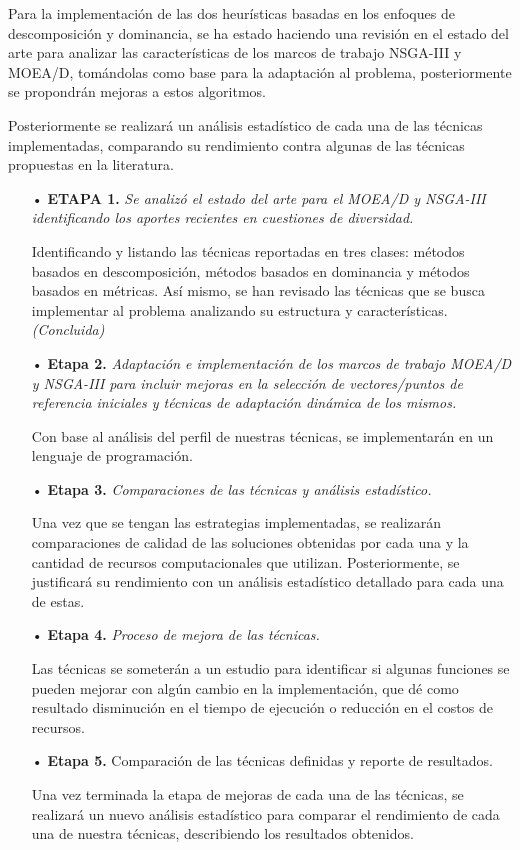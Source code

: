 \documentclass[letterpaper,10pt]{article}
\begin{document}
Para la implementación de las dos heurísticas basadas en los enfoques de descomposición y dominancia, se ha estado haciendo una revisión en el estado del arte para analizar las características de los marcos de trabajo NSGA-III y MOEA/D, tomándolas  como  base para la adaptación al problema, posteriormente se propondrán mejoras a estos algoritmos.
 
Posteriormente se realizará un análisis estadístico de cada una de las técnicas implementadas, comparando su rendimiento contra algunas de las  técnicas propuestas en la literatura.
 
 \begin{itemize}
 \item[•] \textbf{ETAPA 1.} \emph{Se analizó el estado del arte para el MOEA/D y NSGA-III identificando los aportes recientes en cuestiones de diversidad.}
\item[] Identificando y listando las técnicas reportadas en tres clases: métodos basados en descomposición, métodos basados en dominancia y métodos basados en métricas. Así mismo, se han revisado las técnicas que se busca implementar al problema analizando su estructura y características.
\emph{(Concluida)}

\item[•] \textbf{Etapa 2.} \emph{Adaptación e implementación de los marcos de trabajo MOEA/D y NSGA-III para incluir mejoras en la selección de vectores/puntos de referencia iniciales y técnicas de adaptación dinámica de los mismos.}

\item[] Con base al análisis del perfil de nuestras técnicas, se implementarán en un lenguaje de programación.
        
\item[•] \textbf{Etapa 3.} \emph{Comparaciones de las técnicas y análisis estadístico.}

\item [] Una vez que se tengan las estrategias implementadas, se realizarán comparaciones de calidad de las soluciones obtenidas por cada una y la cantidad de recursos computacionales  que utilizan. Posteriormente, se justificará su rendimiento con un análisis estadístico detallado para cada  una de estas.

\item[•] \textbf{Etapa 4.} \emph{Proceso de mejora de las técnicas.}

\item[] Las técnicas se someterán a un estudio para identificar si algunas funciones se pueden mejorar con algún cambio en la implementación, que dé como resultado disminución en el tiempo de ejecución o reducción en el costos de recursos.


\item[•] \textbf{Etapa 5.} Comparación de las técnicas definidas y reporte de resultados.

\item[] Una vez terminada la etapa de mejoras de cada una de las técnicas, se realizará un nuevo análisis estadístico para comparar el rendimiento de cada una de nuestra técnicas, describiendo los resultados obtenidos.
        
  \end{itemize}
\end{document}
